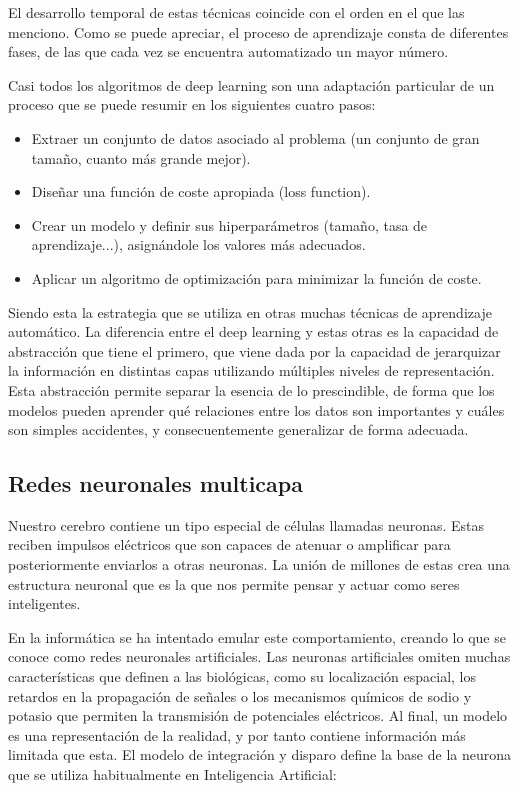El desarrollo temporal de estas técnicas coincide con el orden en el que las menciono. Como se puede apreciar, el proceso de aprendizaje consta de diferentes fases, de las que cada vez se encuentra automatizado un mayor número.

Casi todos los algoritmos de deep learning son una adaptación particular de un proceso que se puede resumir en los siguientes cuatro pasos:

\begin{itemize}
    \item Extraer un conjunto de datos asociado al problema (un conjunto de gran tamaño, cuanto más grande mejor).
    \item Diseñar una función de coste apropiada (loss function).
    \item Crear un modelo y definir sus hiperparámetros (tamaño, tasa de aprendizaje...), asignándole los valores más adecuados.
    \item Aplicar un algoritmo de optimización para minimizar la función de coste.
\end{itemize}

Siendo esta la estrategia que se utiliza en otras muchas técnicas de aprendizaje automático. La diferencia entre el deep learning y estas otras es la capacidad de abstracción que tiene el primero, que viene dada por la capacidad de jerarquizar la información en distintas capas utilizando múltiples niveles de representación. Esta abstracción permite separar la esencia de lo prescindible, de forma que los modelos pueden aprender qué relaciones entre los datos son importantes y cuáles son simples accidentes, y consecuentemente generalizar de forma adecuada. \cite{berzal2018redes}

\subsection{Redes neuronales multicapa}
Nuestro cerebro contiene un tipo especial de células llamadas neuronas. Estas reciben impulsos eléctricos que son capaces de atenuar o amplificar para posteriormente enviarlos a otras neuronas. La unión de millones de estas crea una estructura neuronal que es la que nos permite pensar y actuar como seres inteligentes.

En la informática se ha intentado emular este comportamiento, creando lo que se conoce como redes neuronales artificiales. Las neuronas artificiales omiten muchas características que definen a las biológicas, como su localización espacial, los retardos en la propagación de señales o los mecanismos químicos de sodio y potasio que permiten la transmisión de potenciales eléctricos. Al final, un modelo es una representación de la realidad, y por tanto contiene información más limitada que esta. El modelo de integración y disparo define la base de la neurona que se utiliza habitualmente en Inteligencia Artificial:

